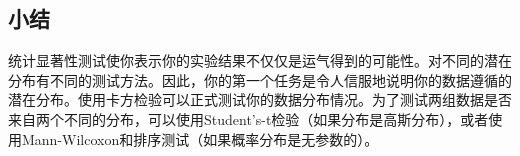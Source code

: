 
\subsection{小结}
统计显著性测试使你表示你的实验结果不仅仅是运气得到的可能性。对不同的潜在分布有不同的测试方法。因此，你的第一个任务是令人信服地说明你的数据遵循的潜在分布。使用卡方检验可以正式测试你的数据分布情况。为了测试两组数据是否来自两个不同的分布，可以使用Student's-t检验（如果分布是高斯分布），或者使用Mann-Wilcoxon和排序测试（如果概率分布是无参数的）。
